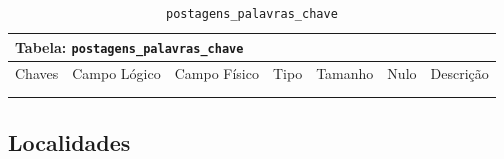 \documentclass[12pt,a4paper]{article}
\begin{document}
\begin{center}
\begin{table}[h!]
	\caption{\texttt{postagens\_palavras\_chave}}
	\label{tabela:postagensPalavrasChave}
	\begin{tabular}{|p{1cm}|p{1.5cm}|p{1.25cm}|p{1.25cm}|p{1.75cm}|p{1.25cm}|p{4.5cm}|}\hline	
		\multicolumn{7}{|p{16cm}|}{\cellcolor{cinzaClaro}  \centering Tabela: \texttt{postagens\_palavras\_chave}} \\ \hline %
		{\small Chaves} & {\small Campo Lógico} & {\small Campo Físico} & {\small Tipo} & {\small Tamanho} & {\small Nulo} & {\small Descrição}\\\hline %
		
		{\tiny } & {\tiny } & {\tiny } & {\tiny } & {\tiny } & {\tiny } &{\tiny }\\\hline
		{\tiny } & {\tiny } & {\tiny } & {\tiny } & {\tiny } & {\tiny } &{\tiny }\\\hline
		
			
	\end{tabular}
\end{table}	
\end{center}








\subsection{Localidades}

\end{document}
